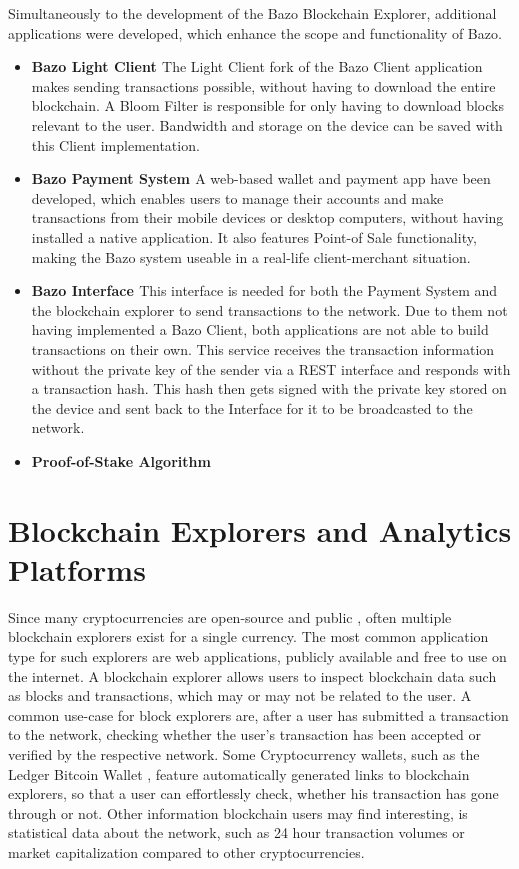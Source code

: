 Simultaneously to the development of the Bazo Blockchain Explorer, additional applications were developed, which enhance the scope and functionality of Bazo. 

\begin{itemize}
\item \textbf{Bazo Light Client \cite{marc}}
The Light Client fork of the Bazo Client application makes sending transactions possible, without having to download the entire blockchain. A Bloom Filter is responsible for only having to download blocks relevant to the user. Bandwidth and storage on the device can be saved with this Client implementation.
\item \textbf{Bazo Payment System \cite{payment}}
A web-based wallet and payment app have been developed, which enables users to manage their accounts and make transactions from their mobile devices or desktop computers, without having installed a native application. It also features Point-of Sale functionality, making the Bazo system useable in a real-life client-merchant situation.
\item \textbf{Bazo Interface \cite{marc}}
This interface is needed for both the Payment System and the blockchain explorer to send transactions to the network. Due to them not having implemented a Bazo Client, both applications are not able to build transactions on their own. This service receives the transaction information without the private key of the sender via a REST interface and responds with a transaction hash. This hash then gets signed with the private key stored on the device and sent back to the Interface for it to be broadcasted to the network.
\item \textbf{Proof-of-Stake Algorithm \cite{pos}}
\end{itemize}

\section{Blockchain Explorers and Analytics Platforms}
Since many cryptocurrencies are open-source and public \cite{ethereum} \cite{bitcoin}, often multiple blockchain explorers exist for a single currency. The most common application type for such explorers are web applications, publicly available and free to use on the internet. A blockchain explorer allows users to inspect blockchain data such as blocks and transactions, which may or may not be related to the user. A common use-case for block explorers are, after a user has submitted a transaction to the network, checking whether the user's transaction has been accepted or verified by the respective network. Some Cryptocurrency wallets, such as the Ledger Bitcoin Wallet \cite{btcwallet}, feature automatically generated links to blockchain explorers, so that a user can effortlessly check, whether his transaction has gone through or not. Other information blockchain users may find interesting, is statistical data about the network, such as 24 hour transaction volumes or market capitalization compared to other cryptocurrencies. 

